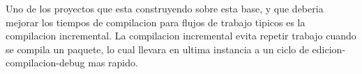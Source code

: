 \documentclass[12pt, a4paper]{report}
\begin{document}
    Uno de los proyectos que esta construyendo sobre esta base, y que deberia mejorar los tiempos de compilacion para flujos de trabajo tipicos es la compilacion incremental.
    La compilacion incremental evita repetir trabajo cuando se compila un paquete, lo cual llevara en ultima instancia a un ciclo de edicion-compilacion-debug mas rapido.
    \cite{rust_blog_incremental_compilation}


\end{document}
